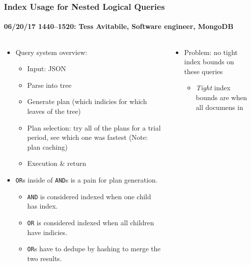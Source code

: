 \documentclass[xcolor=dvipsnames, 9pt]{beamer}
\begin{document}
\begin{frame}
    \frametitle{Index Usage for Nested Logical Queries}
    \framesubtitle{%
        06/20/17 1440--1520:
        Tess Avitabile, Software engineer, MongoDB
    }
    \begin{columns}
        \begin{column}{0.5\textwidth}
            \begin{itemize}
                \item Query system overview:
                    \begin{itemize}
                        \item Input: JSON
                        \item Parse into tree
                        \item Generate plan (which indicies for which leaves of
                            the tree)
                        \item Plan selection: try all of the plans for a trial
                            period, see which one was fastest (Note: plan
                            caching)
                        \item Execution \& return
                    \end{itemize}
                \item \texttt{OR}s inside of \texttt{AND}s is a pain for plan
                    generation.
                    \begin{itemize}
                        \item \texttt{AND} is considered indexed when one child
                            has index.
                        \item \texttt{OR} is considered indexed when all
                            children have indicies.
                        \item \texttt{OR}s have to dedupe by hashing to merge
                            the two results.
                    \end{itemize}
            \end{itemize}
        \end{column}
        \begin{column}{0.5\textwidth}
            \begin{itemize}
                \item Problem: no tight index bounds on these queries
                    \begin{itemize}
                        \item \emph{Tight} index bounds are when all documens in

\end{itemize}
\end{itemize}
\end{column}
\end{columns}
\end{frame}
\end{document}
